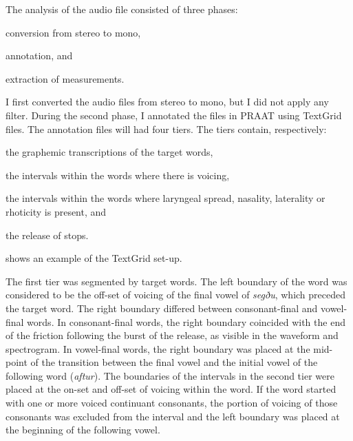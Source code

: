 The analysis of the audio file consisted of three phases:
\begin{inparaenum}[(1)]
	\item conversion from stereo to mono,
	\item annotation, and
	\item extraction of measurements.
\end{inparaenum}
I first converted the audio files from stereo to mono, but I did not apply any filter.
During the second phase, I annotated the files in PRAAT \citep{boersma2015} using TextGrid files.
The annotation files will had four tiers.
The tiers contain, respectively: 
\begin{inparaenum}[(1)]
	\item the graphemic transcriptions of the target words,
	\item the intervals within the words where there is voicing, 
	\item the intervals within the words where laryngeal spread, nasality, laterality or rhoticity is present, and
	\item the release of stops.
\end{inparaenum}
 shows an example of the TextGrid set-up.

The first tier was segmented by target words.
The left boundary of the word was considered to be the off-set of voicing of the final vowel of \textit{segðu}, which preceded the target word.
The right boundary differed between consonant-final and vowel-final words.
In consonant-final words, the right boundary coincided with the end of the friction following the burst of the release, as visible in the waveform and spectrogram.
In vowel-final words, the right boundary was placed at the mid-point of the transition between the final vowel and the initial vowel of the following word (\textit{aftur}).
The boundaries of the intervals in the second tier were placed at the on-set and off-set of voicing within the word.
If the word started with one or more voiced continuant consonants, the portion of voicing of those consonants was excluded from the interval and the left boundary was placed at the beginning of the following vowel.

